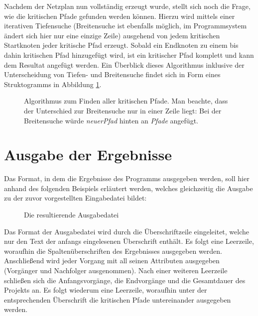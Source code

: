Nachdem der Netzplan nun vollst\"andig erzeugt wurde, stellt sich noch
die Frage, wie die kritischen Pfade gefunden werden k\"onnen. Hierzu
wird mittels einer iterativen Tiefensuche (Breitensuche ist ebenfalls
m\"oglich, im
Programmsystem \"andert sich hier nur eine einzige Zeile) ausgehend
von jedem kritischen Startknoten
jeder kritische Pfad erzeugt. Sobald ein Endknoten zu einem bis dahin
kritischen Pfad hinzugef\"ugt wird, ist ein kritischer Pfad
komplett und kann dem Resultat angef\"ugt werden. Ein \"Uberblick
dieses Algorithmus inklusive der Unterscheidung von Tiefen- und
Breitensuche findet sich in Form eines Struktogramms in
Abbildung \ref{pfadefinden}.

\begin{figure}
  
  \caption{Algorithmus zum Finden aller kritischen Pfade. Man beachte,
  dass der Unterschied zur Breitensuche nur in einer Zeile liegt: Bei
  der Breitensuche w\"urde \textit{neuerPfad} hinten an \textit{Pfade}
  angef\"ugt.}
  \label{pfadefinden}
\end{figure}

\section{Ausgabe der Ergebnisse}

Das Format, in dem die Ergebnisse des Programms ausgegeben werden, soll
hier anhand des folgenden Beispiels erl\"autert werden, welches
gleichzeitig die Ausgabe zu der zuvor vorgestellten Eingabedatei bildet:

\begin{figure}[h!]
  \resizebox{\textwidth}{!}{
    \fbox{
      \setlength{\fboxrule}{1pt}
      
    }
  }
  \caption{Die resultierende Ausgabedatei}
\end{figure}

Das Format der Ausgabedatei wird durch die \"Uberschriftzeile
eingeleitet, welche nur den Text der anfangs eingelesenen
\"Uberschrift enth\"alt. Es folgt eine Leerzeile, woraufhin die
Spalten\"uberschriften des Ergebnisses ausgegeben
werden. Anschlie{\ss}end wird jeder Vorgang mit all seinen
Attributen ausgegeben (Vorg\"anger und Nachfolger ausgenommen).
Nach einer weiteren Leerzeile schlie{\ss}en sich die
Anfangsvorg\"ange, die Endvorg\"ange und die Gesamtdauer des Projekts
an. Es folgt wiederum eine
Leerzeile, woraufhin unter der entsprechenden \"Uberschrift die
kritischen Pfade untereinander ausgegeben werden.
